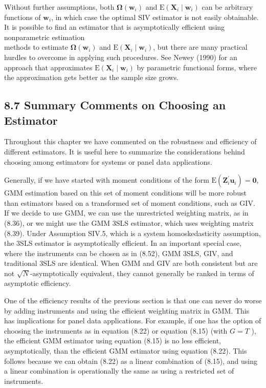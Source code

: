 \documentclass[10pt]{article}
\begin{document}
Without further assumptions, both $\boldsymbol{\Omega}\left(\mathbf{w}_{i}\right)$ and $\mathrm{E}\left(\mathbf{X}_{i} \mid \mathbf{w}_{i}\right)$ can be arbitrary functions of $\mathbf{w}_{i}$, in which case the optimal SIV estimator is not easily obtainable. It is possible to find an estimator that is asymptotically efficient using nonparametric estimation\\
methods to estimate $\boldsymbol{\Omega}\left(\mathbf{w}_{i}\right)$ and $\mathrm{E}\left(\mathbf{X}_{i} \mid \mathbf{w}_{i}\right)$, but there are many practical hurdles to overcome in applying such procedures. See Newey (1990) for an approach that approximates $\mathrm{E}\left(\mathbf{X}_{i} \mid \mathbf{w}_{i}\right)$ by parametric functional forms, where the approximation gets better as the sample size grows.

\subsection*{8.7 Summary Comments on Choosing an Estimator}
Throughout this chapter we have commented on the robustness and efficiency of different estimators. It is useful here to summarize the considerations behind choosing among estimators for systems or panel data applications.

Generally, if we have started with moment conditions of the form $\mathrm{E}\left(\mathbf{Z}_{i}^{\prime} \mathbf{u}_{i}\right)=\mathbf{0}$, GMM estimation based on this set of moment conditions will be more robust than estimators based on a transformed set of moment conditions, such as GIV. If we decide to use GMM, we can use the unrestricted weighting matrix, as in (8.36), or we might use the GMM 3SLS estimator, which uses weighting matrix (8.39). Under Assumption SIV.5, which is a system homoskedasticity assumption, the 3SLS estimator is asymptotically efficient. In an important special case, where the instruments can be chosen as in (8.52), GMM 3SLS, GIV, and traditional 3SLS are identical. When GMM and GIV are both consistent but are not $\sqrt{N}$-asymptotically equivalent, they cannot generally be ranked in terms of asymptotic efficiency.

One of the efficiency results of the previous section is that one can never do worse by adding instruments and using the efficient weighting matrix in GMM. This has implications for panel data applications. For example, if one has the option of choosing the instruments as in equation (8.22) or equation (8.15) (with $G=T$ ), the efficient GMM estimator using equation (8.15) is no less efficient, asymptotically, than the efficient GMM estimator using equation (8.22). This follows because we can obtain (8.22) as a linear combination of (8.15), and using a linear combination is operationally the same as using a restricted set of instruments.
\end{document}
